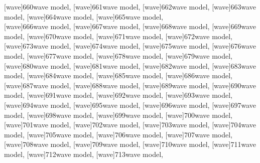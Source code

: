 \documentclass[a4paper,11pt]{article}
\begin{document}
[wave]{660}{wave model},
[wave]{661}{wave model},
[wave]{662}{wave model},
[wave]{663}{wave model},
[wave]{664}{wave model},
[wave]{665}{wave model}, \\[0.7em]
[wave]{666}{wave model},
[wave]{667}{wave model},
[wave]{668}{wave model},
[wave]{669}{wave model},
[wave]{670}{wave model},
[wave]{671}{wave model},
[wave]{672}{wave model}, \\[0.7em]
[wave]{673}{wave model},
[wave]{674}{wave model},
[wave]{675}{wave model},
[wave]{676}{wave model},
[wave]{677}{wave model},
[wave]{678}{wave model},
[wave]{679}{wave model}, \\[0.7em]
[wave]{680}{wave model},
[wave]{681}{wave model},
[wave]{682}{wave model},
[wave]{683}{wave model},
[wave]{684}{wave model},
[wave]{685}{wave model},
[wave]{686}{wave model}, \\[0.7em]
[wave]{687}{wave model},
[wave]{688}{wave model},
[wave]{689}{wave model},
[wave]{690}{wave model},
[wave]{691}{wave model},
[wave]{692}{wave model},
[wave]{693}{wave model}, \\[0.7em]
[wave]{694}{wave model},
[wave]{695}{wave model},
[wave]{696}{wave model},
[wave]{697}{wave model},
[wave]{698}{wave model},
[wave]{699}{wave model},
[wave]{700}{wave model}, \\[0.7em]
[wave]{701}{wave model},
[wave]{702}{wave model},
[wave]{703}{wave model},
[wave]{704}{wave model},
[wave]{705}{wave model},
[wave]{706}{wave model},
[wave]{707}{wave model}, \\[0.7em]
[wave]{708}{wave model},
[wave]{709}{wave model},
[wave]{710}{wave model},
[wave]{711}{wave model},
[wave]{712}{wave model},
[wave]{713}{wave model},
\end{document}
